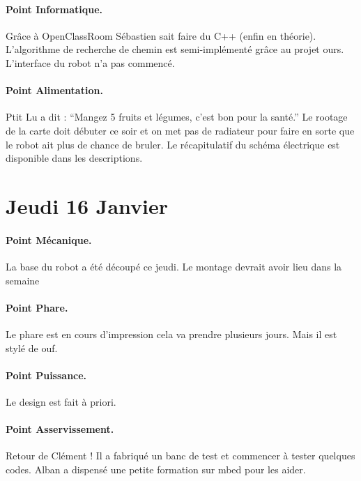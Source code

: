 \documentclass[a4paper,10pt]{report}
\begin{document}
\begin{spacing}{1.5}
\paragraph{Point Informatique.}
Grâce à OpenClassRoom Sébastien sait faire du C++ (enfin en théorie).
L'algorithme de recherche de chemin est semi-implémenté grâce au projet ours.
L'interface du robot n'a pas commencé.
\paragraph{Point Alimentation.}
Ptit Lu a dit : ``Mangez 5 fruits et légumes, c'est bon pour la santé.''
Le rootage de la carte doit débuter ce soir et on met pas de radiateur pour
faire en sorte que le robot ait plus de chance de bruler. Le récapitulatif du
schéma électrique est disponible dans les descriptions.


\newpage
\section*{Jeudi 16 Janvier}
\paragraph{Point Mécanique.}
La base du robot a été découpé ce jeudi. Le montage devrait avoir lieu dans la semaine
\paragraph{Point Phare.}
Le phare est en cours d'impression cela va prendre plusieurs jours. Mais il est
stylé de ouf.
\paragraph{Point Puissance.}
Le design est fait à priori.
\paragraph{Point Asservissement.}
Retour de Clément ! Il a fabriqué un banc de test et commencer à tester quelques
codes. Alban a dispensé une petite formation sur mbed pour les aider.

\end{spacing}
\end{document}

